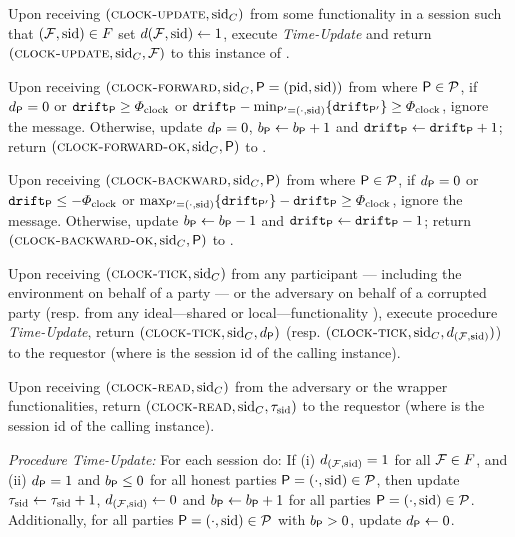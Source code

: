 \begin{cccFunctionality}
\begin{cccItemize}[nosep]
        \item Upon receiving $(\textsc{clock-update}, \mathrm{sid}_C)$ from some functionality \F in a session \sid such that $(\mathcal{F}, \mathrm{sid}) \in F$ set $d(\mathcal{F}, \mathrm{sid}) \gets 1$, execute \emph{Time-Update} and return $(\textsc{clock-update},\allowbreak \mathrm{sid}_C, \mathcal{F})$ to this instance of \F.

        \item Upon receiving $(\textsc{clock-forward}, \mathrm{sid}_C , \mathsf{P} = (\mathrm{pid}, \mathrm{sid}))$ from \adv where $\mathsf{P} \in \mathcal{P}$, if $d_\mathsf{P} = 0$ or $\mathtt{drift}_\mathsf{P} \ge \varPhi_{\mathrm{clock}}$ or $\mathtt{drift}_\mathsf{P} - \min_{\mathsf{P}' = (\cdot, \mathrm{sid})} \{ \mathtt{drift}_{\mathsf{P}'} \} \ge \varPhi_{\mathrm{clock}}$, ignore the message.
        Otherwise, update $d_\mathsf{P} = 0$, $b_\mathsf{P} \gets b_\mathsf{P} + 1$ and $\mathtt{drift}_\mathsf{P} \gets \mathtt{drift}_\mathsf{P} + 1$; return $(\textsc{clock-forward-ok}, \mathrm{sid}_C , \mathsf{P})$ to \adv.

        \item Upon receiving $(\textsc{clock-backward}, \mathrm{sid}_C , \mathsf{P})$ from \adv where $\mathsf{P} \in \mathcal{P}$, if $d_\mathsf{P} = 0$ or$\mathtt{drift}_\mathsf{P} \le - \varPhi_{\mathrm{clock}}$ or $\max_{\mathsf{P}' = (\cdot, \mathrm{sid})} \{ \mathtt{drift}_{\mathsf{P}'} \} - \mathtt{drift}_\mathsf{P} \ge \varPhi_{\mathrm{clock}}$, ignore the message.
        Otherwise, update $b_\mathsf{P} \gets b_\mathsf{P} - 1$ and $\mathtt{drift}_\mathsf{P} \gets \mathtt{drift}_\mathsf{P} - 1$; return $(\textsc{clock-backward-ok}, \mathrm{sid}_C , \mathsf{P})$ to \adv.

        \item Upon receiving $(\textsc{clock-tick}, \mathrm{sid}_C)$ from any participant \party --- including the environment on behalf of a party --- or the adversary on behalf of a corrupted party \party (resp. from any ideal---shared or local---functionality \F), execute procedure \textit{Time-Update}, return $(\textsc{clock-tick}, \mathrm{sid}_C, d_{\mathsf{P}})$ (resp. $(\textsc{clock-tick}, \mathrm{sid}_C, d_{(\mathcal{F}, \mathrm{sid})})$) to the requestor (where \sid is the session id of the calling instance).

        \item Upon receiving $(\textsc{clock-read}, \mathrm{sid}_C)$ from the adversary or the wrapper functionalities, return $(\textsc{clock-read},\mathrm{sid}_C, \tau_{\mathrm{sid}})$ to the requestor (where \sid is the session id of the calling instance).
    \end{cccItemize}

    \smallskip\emph{Procedure Time-Update:}
    For each session \sid do: If (i) $d_{(\mathcal{F}, \mathrm{sid})} = 1$ for all $\mathcal{F} \in F$, and (ii) $d_\mathsf{P} = 1$ and $b_\mathsf{P} \le 0$ for all honest parties $\mathsf{P} = (\cdot, \mathrm{sid}) \in \mathcal{P}$, then update $\tau_\mathrm{sid} \gets \tau_\mathrm{sid} + 1$, $d_{(\mathcal{F},\mathrm{sid})} \gets 0$ and $b_\mathsf{P} \gets b_\mathsf{P} + 1$ for all parties $\mathsf{P} = (\cdot, \mathrm{sid}) \in \mathcal{P}$.
    Additionally, for all parties $\mathsf{P} = (\cdot, \mathrm{sid}) \in \mathcal{P}$ with $b_\mathsf{P} > 0$, update $d_\mathsf{P} \gets 0$.
\end{cccFunctionality}
